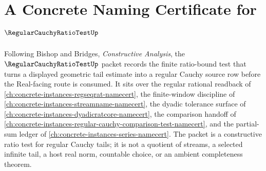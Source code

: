 \chapter{A Concrete Naming Certificate for $\RegularCauchyRatioTestUp$}
\label{ch:concrete-instances-regular-cauchy-ratio-test-namecert}

Following Bishop and Bridges, \emph{Constructive Analysis}, the $\RegularCauchyRatioTestUp$ packet records the finite ratio-bound test that turns a displayed geometric tail estimate into a regular Cauchy source row before the Real-facing route is consumed. It sits over the regular rational readback of \autoref{ch:concrete-instances-regseqrat-namecert}, the finite-window discipline of \autoref{ch:concrete-instances-streamname-namecert}, the dyadic tolerance surface of \autoref{ch:concrete-instances-dyadicratcore-namecert}, the comparison handoff of \autoref{ch:concrete-instances-regular-cauchy-comparison-test-namecert}, and the partial-sum ledger of \autoref{ch:concrete-instances-series-namecert}. The packet is a constructive ratio test for regular Cauchy tails; it is not a quotient of streams, a selected infinite tail, a host real norm, countable choice, or an ambient completeness theorem.


